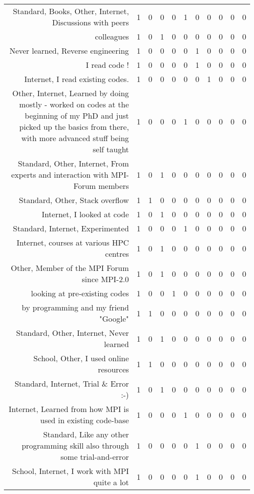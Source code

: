 {\begin{landscape}
\begin{longtable}[htb]{r|c|c|c|c|c|c|c|c|c|c}
{Standard, Books, Other, Internet, Discussions with peers} & 1 & 0 & 0 & 0 & 1 & 0 & 0 & 0 & 0 & 0 \\%
{colleagues} & 1 & 0 & 1 & 0 & 0 & 0 & 0 & 0 & 0 & 0 \\%
{Never learned, Reverse engineering} & 1 & 0 & 0 & 0 & 0 & 1 & 0 & 0 & 0 & 0 \\%
{I read code !} & 1 & 0 & 0 & 0 & 0 & 1 & 0 & 0 & 0 & 0 \\%
{Internet, I read existing codes.} & 1 & 0 & 0 & 0 & 0 & 0 & 1 & 0 & 0 & 0 \\%
{Other, Internet, Learned by doing mostly - worked on codes at the beginning of my PhD and just picked up the basics from there, with more advanced stuff being self taught} & 1 & 0 & 0 & 0 & 1 & 0 & 0 & 0 & 0 & 0 \\%
{Standard, Other, Internet, From experts and interaction with MPI-Forum members} & 1 & 0 & 1 & 0 & 0 & 0 & 0 & 0 & 0 & 0 \\%
{Standard, Other, Stack overflow} & 1 & 1 & 0 & 0 & 0 & 0 & 0 & 0 & 0 & 0 \\%
{Internet, I looked at code} & 1 & 0 & 1 & 0 & 0 & 0 & 0 & 0 & 0 & 0 \\%
{Standard, Internet, Experimented} & 1 & 0 & 0 & 0 & 1 & 0 & 0 & 0 & 0 & 0 \\%
{Internet, courses at various HPC centres} & 1 & 0 & 1 & 0 & 0 & 0 & 0 & 0 & 0 & 0 \\%
{Other, Member of the MPI Forum since MPI-2.0} & 1 & 0 & 1 & 0 & 0 & 0 & 0 & 0 & 0 & 0 \\%
{looking at pre-existing codes} & 1 & 0 & 0 & 1 & 0 & 0 & 0 & 0 & 0 & 0 \\%
{by programming and my friend "Google"} & 1 & 1 & 0 & 0 & 0 & 0 & 0 & 0 & 0 & 0 \\%
{Standard, Other, Internet, Never learned} & 1 & 0 & 1 & 0 & 0 & 0 & 0 & 0 & 0 & 0 \\%
{School, Other, I used online resources} & 1 & 1 & 0 & 0 & 0 & 0 & 0 & 0 & 0 & 0 \\%
{Standard, Internet, Trial \& Error :-)} & 1 & 0 & 1 & 0 & 0 & 0 & 0 & 0 & 0 & 0 \\%
{Internet, Learned from how MPI is used in existing code-base} & 1 & 0 & 0 & 0 & 1 & 0 & 0 & 0 & 0 & 0 \\%
{Standard, Like any other programming skill also through some trial-and-error} & 1 & 0 & 0 & 0 & 0 & 1 & 0 & 0 & 0 & 0 \\%
{School, Internet, I work with MPI quite a lot} & 1 & 0 & 0 & 0 & 0 & 1 & 0 & 0 & 0 & 0 \\%

\end{longtable}
\end{landscape}}
